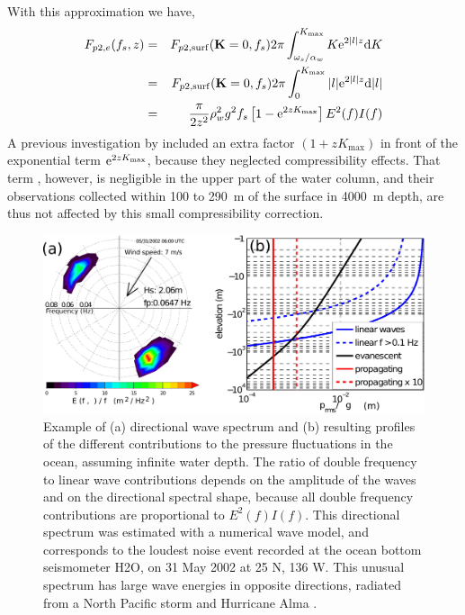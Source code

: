 With this approximation we have, 
\begin{eqnarray}
F_{p2,e}(f_s,z)  &= & F_{p2,\mathrm{surf}}(\mathbf{K}=0,f_s) 2 \pi \int_{\omega_s/\alpha_w}^{K_{\max}}  K \mathrm{e}^{2|l|z} {\mathrm d} K   \nonumber \\
                 &  = &F_{p2,\mathrm{surf}}(\mathbf{K}=0,f_s) 2 \pi \int_{0}^{K_{\max}}  |l| \mathrm{e}^{2|l|z} {\mathrm d} |l|   \nonumber \\
                 &  = &\frac{\pi}{2 z^2}  \rho_w^2 g^2  f_s \left[1-\mathrm{e}^{2 z K_{\max}}\right]  E^2(f)I(f)    \label{Fp1Dag} 
\end{eqnarray}
A previous investigation by \cite{Cox&Jacobs1989} included an extra factor $(1 + z K_{\max})$ in front 
of the exponential term $\mathrm{e}^{2 z K_{\max}}$, because they neglected compressibility effects. 
That term , however, is negligible in the upper part of the water column, and their observations collected within 100 to 
290~m of the surface in 4000~m depth, are thus not affected by this small 
compressibility correction. 

\begin{figure}[htb]
\centerline{\includegraphics[width=\columnwidth]{FIGS_CH_SISMO/P_profiles_and_spec_v2.pdf}}
  \caption{Example of (a) directional wave spectrum and (b) 
resulting profiles of the different contributions to the pressure fluctuations in the ocean, 
assuming infinite water depth. 
The ratio of double frequency 
to linear wave contributions depends on the amplitude of the waves and on the directional spectral shape, 
because all double 
frequency contributions are proportional to $E^2(f)I(f)$. This directional spectrum was estimated with a numerical wave model, 
and corresponds to the loudest noise 
event recorded at the ocean bottom seismometer H2O, on 31 May  2002 at 25 N, 136 W. This unusual spectrum 
 has large wave energies in opposite directions, radiated from 
a North Pacific storm and Hurricane Alma \citep[This event is analyzed in detail by][]{Obrebski&al.2012}.}
\label{fig:P_profiles}
\end{figure}

